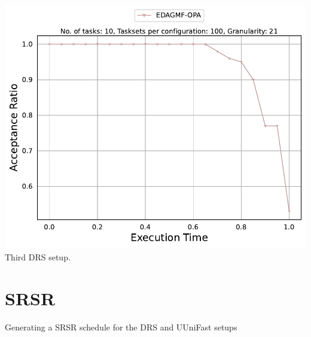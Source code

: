 \documentclass[]{article}
\begin{document}
\begin{minipage}[t]{0.48\linewidth}
            \includegraphics[width=\linewidth]{EDAGMF-OPA_3rd.pdf}
		Third DRS setup.
		\vspace{0.3cm}
                   

	\end{minipage}


	\clearpage
	\section{SRSR}
{
\raggedleft Generating a SRSR schedule for the DRS and UUniFast setups \newline
}
\end{document}
